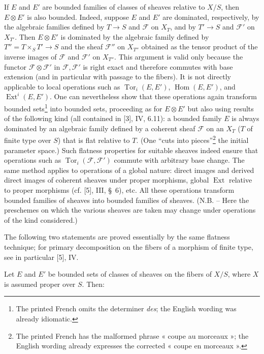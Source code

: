 If $E$ and $E'$ are bounded families of classes of sheaves relative to $X/S$,
then $E\otimes E'$ is also bounded. Indeed, suppose $E$ and $E'$ are dominated,
respectively, by the algebraic families defined by $T\longrightarrow S$ and
$\mathcal F$ on $X_T$, and by $T'\longrightarrow S$ and $\mathcal F'$ on
$X_{T'}$. Then $E\otimes E'$ is dominated by the algebraic family defined by
$T''=T\times_S T'\longrightarrow S$ and the sheaf $\mathcal F''$ on
$X_{T''}$ obtained as the tensor product of the inverse images of $\mathcal F$
and $\mathcal F'$ on $X_{T''}$. This argument is valid only because the functor
$\mathcal F\otimes\mathcal F'$ in $\mathcal F,\mathcal F'$ is right exact and
therefore commutes with base extension (and in particular with passage to the
fibers). It is not directly applicable to local operations such as
$\operatorname{Tor}_i(E,E')$, $\operatorname{Hom}(E,E')$, and
$\operatorname{Ext}^i(E,E')$. One can nevertheless show that these operations
again transform bounded sets\footnote{The printed French omits the determiner \emph{des}; the English wording was already idiomatic.} into bounded sets, proceeding as for
$E\otimes E'$ but also using results of the following kind (all contained in
[3], IV, 6.11): a bounded family $E$ is always dominated by an algebraic
family defined by a coherent sheaf $\mathcal F$ on an $X_T$ ($T$ of finite
type over $S$) that is flat relative to $T$. (One “cuts into pieces”\footnote{The printed French has the malformed phrase « coupe au morceaux »; the English wording already expresses the corrected « coupe en morceaux ».} the
initial parameter space.) Such
flatness properties for suitable sheaves indeed ensure that operations such as
$\operatorname{Tor}_i(\mathcal F,\mathcal F')$ commute with arbitrary base
change. The same method applies to operations of a global nature: direct
images and derived direct images of coherent sheaves under proper morphisms,
global $\operatorname{Ext}$ relative to proper morphisms (cf. [5], III,
\S~6), etc. All these operations transform bounded families of sheaves into
bounded families of sheaves. (N.B. -- Here the preschemes on which the various
sheaves are taken may change under operations of the kind considered.)

The following two statements are proved essentially by the same flatness
technique; for primary decomposition on the fibers of a morphism of finite
type, see in particular [5], IV.

 Let $E$ and $E'$ be bounded sets of classes of
sheaves on the fibers of $X/S$, where $X$ is assumed proper over $S$. Then:

